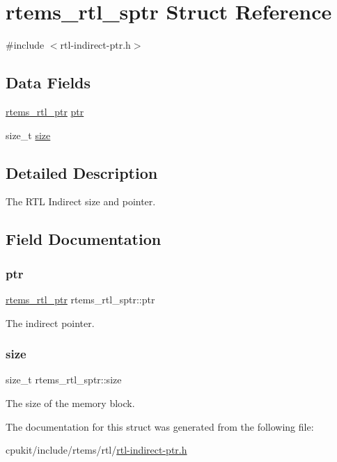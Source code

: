 \hypertarget{structrtems__rtl__sptr}{}\section{rtems\+\_\+rtl\+\_\+sptr Struct Reference}
\label{structrtems__rtl__sptr}


{\ttfamily \#include $<$rtl-\/indirect-\/ptr.\+h$>$}

\subsection*{Data Fields}
\begin{DoxyCompactItemize}
\item 
\mbox{\hyperlink{structrtems__rtl__ptr}{rtems\+\_\+rtl\+\_\+ptr}} \mbox{\hyperlink{structrtems__rtl__sptr_a3e41c42a75b42cd93f3e15b55efbfdbb}{ptr}}
\item 
size\+\_\+t \mbox{\hyperlink{structrtems__rtl__sptr_a5b21be0a4ea9cb16763935d8c5652610}{size}}
\end{DoxyCompactItemize}


\subsection{Detailed Description}
The R\+TL Indirect size and pointer. 

\subsection{Field Documentation}
\mbox{\label{structrtems__rtl__sptr_a3e41c42a75b42cd93f3e15b55efbfdbb}} 
\subsubsection{\texorpdfstring{ptr}{ptr}}
{\footnotesize\ttfamily \mbox{\hyperlink{structrtems__rtl__ptr}{rtems\+\_\+rtl\+\_\+ptr}} rtems\+\_\+rtl\+\_\+sptr\+::ptr}

The indirect pointer. \mbox{\label{structrtems__rtl__sptr_a5b21be0a4ea9cb16763935d8c5652610}} 
\subsubsection{\texorpdfstring{size}{size}}
{\footnotesize\ttfamily size\+\_\+t rtems\+\_\+rtl\+\_\+sptr\+::size}

The size of the memory block. 

The documentation for this struct was generated from the following file\+:\begin{DoxyCompactItemize}
\item 
cpukit/include/rtems/rtl/\mbox{\hyperlink{rtl-indirect-ptr_8h}{rtl-\/indirect-\/ptr.\+h}}\end{DoxyCompactItemize}

